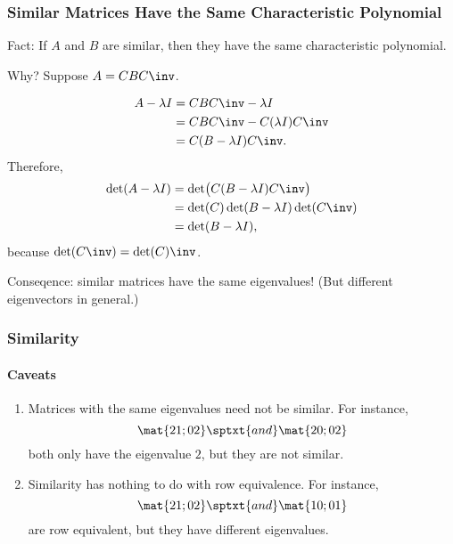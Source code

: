 
\begin{frame}
\frametitle{Similar Matrices Have the Same Characteristic Polynomial}

\alert{Fact:} If $A$ and $B$ are similar, then they have the same characteristic
polynomial.

\pause\medskip
\alert{Why?}
Suppose $A = CBC\inv$.
\begin{webonly}
\[\begin{split}
  A-\lambda I &= CBC\inv - \lambda I \\
  &= CBC\inv - C(\lambda I)C\inv \\
  &= C(B-\lambda I)C\inv.
\end{split}\]
Therefore,
\[\begin{split} \det(A-\lambda I) &= \det\bigl(C(B-\lambda I)C\inv\bigr) \\
&= \det(C)\det(B-\lambda I)\det(C\inv) \\
&= \det(B-\lambda I), \end{split}\]
because $\det(C\inv) = \det(C)\inv$.
\end{webonly}

\pause\medskip
\begin{bluebox}{.7\linewidth}
  \alert{Conseqence:} similar matrices have the same eigenvalues!  
  \pause
  (But different eigenvectors in general.)
\end{bluebox}

\end{frame}



\begin{frame}
\frametitle{Similarity}
\framesubtitle{Caveats}

\vfill
\begin{bluebox}[Warning]{.8\linewidth}
  \begin{enumerate}
  \item Matrices with the same eigenvalues need not be similar.  For instance,
    \[ \mat{2 1; 0 2} \sptxt{and} \mat{2 0; 0 2} \]
    both only have the eigenvalue $2$, but they are not similar.

    \pause

  \item Similarity has nothing to do with row equivalence.  For instance,
    \[ \mat{2 1; 0 2} \sptxt{and} \mat{1 0; 0 1} \]
    are row equivalent, but they have different eigenvalues.
  \end{enumerate}
\end{bluebox}
\vfill

\end{frame}


